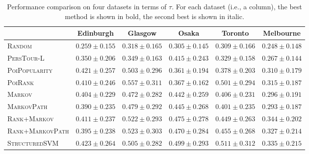 \begin{table*}
\centering
\begin{tabular}{l|ccccc} \hline
 & Edinburgh & Glasgow & Osaka & Toronto & Melbourne \\ \hline
\textsc{Random} & $0.259\pm0.155$ & $0.318\pm0.165$ & $0.305\pm0.145$ & $0.309\pm0.166$ & $0.248\pm0.148$ \\
\textsc{PersTour-L} & $0.350\pm0.206$ & $0.349\pm0.163$ & $0.415\pm0.243$ & $0.329\pm0.158$ & $0.267\pm0.144$ \\
\textsc{PoiPopularity} & $\mathit{0.421\pm0.257}$ & $0.503\pm0.296$ & $0.361\pm0.194$ & $0.378\pm0.203$ & $0.310\pm0.179$ \\
\textsc{PoiRank} & $0.410\pm0.246$ & $\mathbf{0.557\pm0.311}$ & $0.367\pm0.162$ & $\mathit{0.501\pm0.294}$ & $0.315\pm0.187$ \\
\textsc{Markov} & $0.404\pm0.229$ & $0.472\pm0.282$ & $0.442\pm0.259$ & $0.406\pm0.231$ & $0.296\pm0.191$ \\
\textsc{MarkovPath} & $0.390\pm0.235$ & $0.479\pm0.292$ & $0.445\pm0.268$ & $0.401\pm0.235$ & $0.293\pm0.187$ \\
\textsc{Rank+Markov} & $0.411\pm0.237$ & $0.522\pm0.293$ & $\mathit{0.475\pm0.278}$ & $0.449\pm0.263$ & $\mathbf{0.344\pm0.202}$ \\
\textsc{Rank+MarkovPath} & $0.395\pm0.238$ & $\mathit{0.523\pm0.303}$ & $0.470\pm0.284$ & $0.455\pm0.268$ & $0.327\pm0.214$ \\
\textsc{StructuredSVM} & $\mathbf{0.423\pm0.264}$ & $0.505\pm0.282$ & $\mathbf{0.499\pm0.293}$ & $\mathbf{0.511\pm0.312}$ & $\mathit{0.335\pm0.215}$ \\
\hline
\end{tabular}
\caption{Performance comparison on four datasets in terms of $\tau$.
         For each dataset (i.e., a column), the best method is shown in bold, the second best is shown in italic.}
\label{table:tau}
\end{table*}


